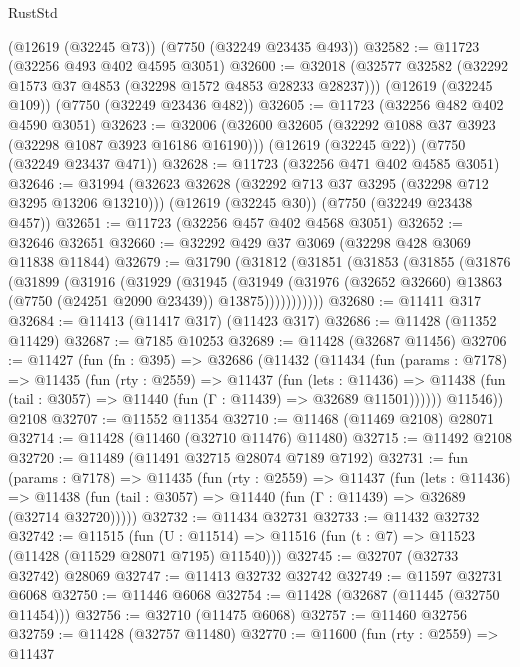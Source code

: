 \begin{lexlean}{RustStd}
\begin{coremodule}
    (@12619 (@32245 @73))
    (@7750 (@32249 @23435 @493))
@32582 := @11723 (@32256 @493 @402 @4595 @3051)
@32600 := @32018
    (@32577 @32582 (@32292 @1573 @37 @4853 (@32298 @1572 @4853 @28233 @28237)))
    (@12619 (@32245 @109))
    (@7750 (@32249 @23436 @482))
@32605 := @11723 (@32256 @482 @402 @4590 @3051)
@32623 := @32006
    (@32600 @32605 (@32292 @1088 @37 @3923 (@32298 @1087 @3923 @16186 @16190)))
    (@12619 (@32245 @22))
    (@7750 (@32249 @23437 @471))
@32628 := @11723 (@32256 @471 @402 @4585 @3051)
@32646 := @31994
    (@32623 @32628 (@32292 @713 @37 @3295 (@32298 @712 @3295 @13206 @13210)))
    (@12619 (@32245 @30))
    (@7750 (@32249 @23438 @457))
@32651 := @11723 (@32256 @457 @402 @4568 @3051)
@32652 := @32646 @32651
@32660 := @32292 @429 @37 @3069 (@32298 @428 @3069 @11838 @11844)
@32679 := @31790
    (@31812
      (@31851
        (@31853
          (@31855
            (@31876
              (@31899
                (@31916
                  (@31929
                    (@31945
                      (@31949
                        (@31976
                          (@32652 @32660)
                          @13863
                          (@7750 (@24251 @2090 @23439))
                          @13875)))))))))))
@32680 := @11411 @317
@32684 := @11413 (@11417 @317) (@11423 @317)
@32686 := @11428 (@11352 @11429)
@32687 := @7185 @10253
@32689 := @11428 (@32687 @11456)
@32706 := @11427
    (fun (fn : @395) =>
    @32686
      (@11432
        (@11434
          (fun (params : @7178) =>
          @11435
            (fun (rty : @2559) =>
            @11437
              (fun (lets : @11436) =>
              @11438 (fun (tail : @3057) => @11440 (fun (Γ : @11439) => @32689 @11501))))))
        @11546))
    @2108
@32707 := @11552 @11354
@32710 := @11468 (@11469 @2108) @28071
@32714 := @11428 (@11460 (@32710 @11476) @11480)
@32715 := @11492 @2108
@32720 := @11489 (@11491 @32715 @28074 @7189 @7192)
@32731 := fun (params : @7178) =>
  @11435
    (fun (rty : @2559) =>
    @11437
      (fun (lets : @11436) =>
      @11438 (fun (tail : @3057) => @11440 (fun (Γ : @11439) => @32689 (@32714 @32720)))))
@32732 := @11434 @32731
@32733 := @11432 @32732
@32742 := @11515
    (fun (U : @11514) => @11516 (fun (t : @7) => @11523 (@11428 (@11529 @28071 @7195) @11540)))
@32745 := @32707 (@32733 @32742) @28069
@32747 := @11413 @32732 @32742
@32749 := @11597 @32731 @6068
@32750 := @11446 @6068
@32754 := @11428 (@32687 (@11445 (@32750 @11454)))
@32756 := @32710 (@11475 @6068)
@32757 := @11460 @32756
@32759 := @11428 (@32757 @11480)
@32770 := @11600
    (fun (rty : @2559) =>
    @11437

\end{coremodule}
\end{lexlean}
